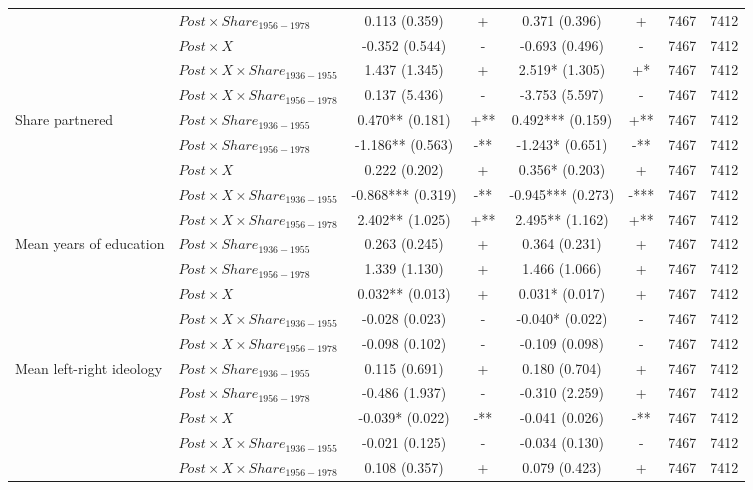 \begin{table}[!htbp]
\begin{tabular}{llcccccc}
 & $Post \times Share_{1956-1978}$ & 0.113 (0.359) & + & 0.371 (0.396) & + & 7467 & 7412 \\
 & $Post \times X$ & -0.352 (0.544) & - & -0.693 (0.496) & - & 7467 & 7412 \\
 & $Post \times X \times Share_{1936-1955}$ & 1.437 (1.345) & + & 2.519* (1.305) & +* & 7467 & 7412 \\
 & $Post \times X \times Share_{1956-1978}$ & 0.137 (5.436) & - & -3.753 (5.597) & - & 7467 & 7412 \\
\addlinespace
Share partnered & $Post \times Share_{1936-1955}$ & 0.470** (0.181) & +** & 0.492*** (0.159) & +** & 7467 & 7412 \\
 & $Post \times Share_{1956-1978}$ & -1.186** (0.563) & -** & -1.243* (0.651) & -** & 7467 & 7412 \\
 & $Post \times X$ & 0.222 (0.202) & + & 0.356* (0.203) & + & 7467 & 7412 \\
 & $Post \times X \times Share_{1936-1955}$ & -0.868*** (0.319) & -** & -0.945*** (0.273) & -*** & 7467 & 7412 \\
 & $Post \times X \times Share_{1956-1978}$ & 2.402** (1.025) & +** & 2.495** (1.162) & +** & 7467 & 7412 \\
\addlinespace
Mean years of education & $Post \times Share_{1936-1955}$ & 0.263 (0.245) & + & 0.364 (0.231) & + & 7467 & 7412 \\
 & $Post \times Share_{1956-1978}$ & 1.339 (1.130) & + & 1.466 (1.066) & + & 7467 & 7412 \\
 & $Post \times X$ & 0.032** (0.013) & + & 0.031* (0.017) & + & 7467 & 7412 \\
 & $Post \times X \times Share_{1936-1955}$ & -0.028 (0.023) & - & -0.040* (0.022) & - & 7467 & 7412 \\
 & $Post \times X \times Share_{1956-1978}$ & -0.098 (0.102) & - & -0.109 (0.098) & - & 7467 & 7412 \\
\addlinespace
Mean left-right ideology & $Post \times Share_{1936-1955}$ & 0.115 (0.691) & + & 0.180 (0.704) & + & 7467 & 7412 \\
 & $Post \times Share_{1956-1978}$ & -0.486 (1.937) & - & -0.310 (2.259) & + & 7467 & 7412 \\
 & $Post \times X$ & -0.039* (0.022) & -** & -0.041 (0.026) & -** & 7467 & 7412 \\
 & $Post \times X \times Share_{1936-1955}$ & -0.021 (0.125) & - & -0.034 (0.130) & - & 7467 & 7412 \\
 & $Post \times X \times Share_{1956-1978}$ & 0.108 (0.357) & + & 0.079 (0.423) & + & 7467 & 7412 \\

\end{tabular}
\end{table}
